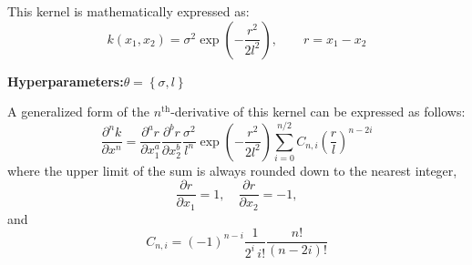 \documentclass{article}
\begin{document}
This kernel is mathematically expressed as:
\begin{equation}
\label{eq:SEKernel}
	k\!\left(x_1,x_2\right) = \sigma^2 \exp{\left(-\frac{r^2}{2l^2}\right)}, \qquad r = x_1 - x_2
\end{equation}

\begin{center}
	\textbf{Hyperparameters:}\hspace{20pt}$\theta = \left\lbrace \sigma,l \right\rbrace$
\end{center}

\begin{comment}
\begin{equation}
\label{eq:SEKernel_d1x}
	\begin{gathered}
	\frac{\partial k\!\left(x_1,x_2\right)}{\partial x_1} = - \frac{\partial r}{\partial x_1} \frac{\sigma^2 r}{l^2} \exp{\left(-\frac{r^2}{2l^2}\right)} \\
	\frac{\partial k\!\left(x_1,x_2\right)}{\partial x_2} = - \frac{\partial r}{\partial x_2} \frac{\sigma^2 r}{l^2} \exp{\left(-\frac{r^2}{2l^2}\right)}
	\end{gathered}
\end{equation}

\begin{equation}
\label{eq:SEKernel_d2x}
	\frac{\partial^2 k\!\left(x_1,x_2\right)}{\partial x_1 \partial x_2} = \frac{\partial r}{\partial x_1} \frac{\partial r}{\partial x_2} \frac{\sigma^2}{l^2} \left(\frac{r^2}{l^2} - 1\right) \exp{\left(-\frac{r^2}{2l^2}\right)}
\end{equation}\hspace{8pt}
\end{comment}

A generalized form of the $n^{\text{th}}$-derivative of this kernel can be expressed as follows:
\begin{equation}
\label{eq:SEKernel_dnx}
	\frac{\partial^n k}{\partial x^n} = \frac{\partial^a r}{\partial x_1^a} \frac{\partial^b r}{\partial x_2^b} \frac{\sigma^2}{l^n} \exp{\left(-\frac{r^2}{2l^2}\right)} \sum_{i=0}^{n/2} C_{n,i} \left(\frac{r}{l}\right)^{n-2i}
\end{equation}
where the upper limit of the sum is always rounded down to the nearest integer,
\begin{equation}
\label{eq:drdx}
	\frac{\partial r}{\partial x_1} = 1, \quad \frac{\partial r}{\partial x_2} = -1,
\end{equation}
and
\begin{equation}
\label{eq:Coefficient_dnx}
	C_{n,i} = \left(-1\right)^{n-i} \frac{1}{2^i \, i!} \frac{n!}{\left(n - 2i\right)!}
\end{equation}
\end{document}

